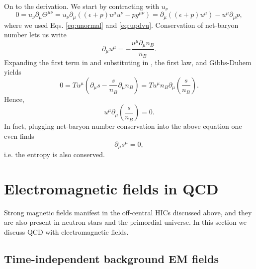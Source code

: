 On to the derivation. We start by contracting  with
$u_\nu$
\begin{equation}\label{eq:snBderiv1}
0=u_\nu\partial_\mu\Theta^{\mu\nu}
=u_\nu\partial_\mu\left(\left(\epsilon+p\right)u^\mu u^\nu-pg^{\mu\nu}\right)
=\partial_\mu\left(\left(\epsilon+p\right)u^\mu\right)-u^\mu\partial_\mu p,
\end{equation}
where we used Eqs. \eqref{eq:unormal} and \eqref{eq:updvu}.
Conservation of net-baryon number lets us write
\begin{equation}\label{eq:snBderiv2}
\partial_\mu u^\mu=-\frac{u^\mu\partial_\mu n_B}{n_B}.
\end{equation}
Expanding the first term in  and substituting
in , the first law, and Gibbs-Duhem yields 
\begin{equation}
0=Tu^\mu\left(\partial_\mu s-\frac{s}{n_B}\partial_\mu n_B\right)
=Tu^\mu n_B\partial_\mu\left(\frac{s}{n_B}\right). 
\end{equation}
Hence,
\begin{equation}
u^\mu \partial_\mu\left(\frac{s}{n_B}\right)=0. 
\end{equation}
In fact, plugging net-baryon number conservation into the above
equation one even finds
\begin{equation}
\partial_\mu s^\mu=0,
\end{equation}
i.e. the entropy is also conserved.

\section{Electromagnetic fields in QCD}\label{sec:EMQCD}

Strong magnetic fields manifest in the off-central HICs discussed above, and
they are also present in neutron stars and the primordial universe. In this
section we discuss QCD with electromagnetic fields.

\subsection{Time-independent background EM fields}


